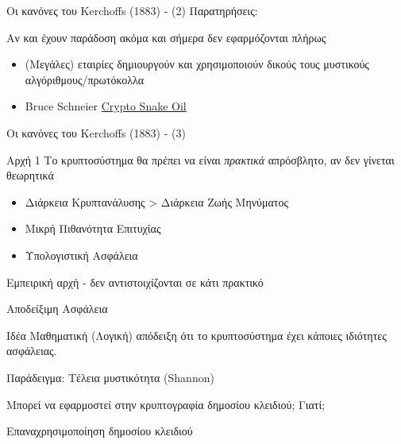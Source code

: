 \documentclass[handout]{beamer}
\begin{document}
\begin{frame}{Οι κανόνες του Kerchoffs (1883) - (2)}
Παρατηρήσεις:

Αν και έχουν παράδοση ακόμα και σήμερα δεν εφαρμόζονται πλήρως
\begin{itemize}
\item (Μεγάλες) εταιρίες δημιουργούν και χρησιμοποιούν δικούς τους μυστικούς αλγόριθμους/πρωτόκολλα \pause

\item Bruce Schneier \href{https://goo.gl/FaFoSK}{Crypto Snake Oil}
\end{itemize}

\end{frame}
 

\begin{frame}{Οι κανόνες του Kerchoffs (1883) - (3)}
\begin{block}{Αρχή 1}
Το κρυπτοσύστημα θα πρέπει να είναι \emph{πρακτικά} απρόσβλητο, αν δεν γίνεται θεωρητικά
\end{block}

\begin{itemize}
\item Διάρκεια Κρυπτανάλυσης > Διάρκεια Ζωής Μηνύματος
\item Μικρή Πιθανότητα Επιτυχίας
\item Υπολογιστική Ασφάλεια
\end{itemize}
\pause 

Εμπειρική αρχή - δεν αντιστοιχίζονται σε κάτι πρακτικό
\end{frame}

\begin{frame}{Αποδείξιμη Ασφάλεια}

\begin{block}{Ιδέα}
Μαθηματική (Λογική) απόδειξη ότι το κρυπτοσύστημα έχει κάποιες ιδιότητες ασφάλειας.
\end{block}

Παράδειγμα: Τέλεια μυστικότητα (Shannon) \pause

Μπορεί να εφαρμοστεί στην κρυπτογραφία δημοσίου κλειδιού; Γιατί;

\pause 

Επαναχρησιμοποίηση δημοσίου κλειδιού

\end{frame}
\end{document}
